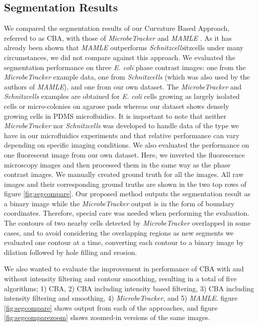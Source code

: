 \documentclass[journal]{IEEEtran}
\begin{document}
\subsection{Segmentation Results}
We compared the segmentation results of our Curvature Based Approach, referred to as CBA, with those of \textit{MicrobeTracker} \cite {sliusarenkohigh2011} and \textit{MAMLE} \cite {chowdhurycell2013}.  As it has already been shown that \textit{MAMLE} outperforms \textit{Schnitzcells}itzcells \cite { youngmeasuring2012} under many circumstances, we did not compare against this approach. We evaluated the segmentation performance on three \textit{E. coli} phase contrast images: one from the \textit{MicrobeTracker} example data, one from \textit{Schnitzcells} (which was also used by the authors of \textit{MAMLE}), and one from our own dataset. The \textit{MicrobeTracker} and  \textit{Schnitzcells} examples are obtained for \textit{E. coli} cells growing as largely isolated cells or micro-colonies on agarose pads whereas our dataset shows densely growing cells in PDMS microfluidics. It is important to note that neither \textit{MicrobeTracker} nor \textit{Schnitzcells} was developed to handle data of the type we have in our microfluidics experiments and that relative performance can vary depending on specific imaging conditions.  We also evaluated the performance on one fluorescent image from our own dataset. Here, we inverted the fluorescence microscopy images and then processed them in the same way as the phase contrast images. We manually created ground truth for all the images. All raw images and their corresponding ground truths are shown in the two top rows of figure \ref{fig:segcompare}. Our proposed method outputs the segmentation result as a binary image while the \textit{MicrobeTracker} output is in the form of boundary coordinates. Therefore, special care was needed when performing the evaluation. The contours of two nearby cells detected by \textit{MicrobeTracker} overlapped in some cases, and to avoid considering the overlapping regions as new segments we evaluated one contour at a time, converting each contour to a binary image by dilation followed by hole filling and erosion.

We also wanted to evaluate the improvement in performance of CBA with and without intensity filtering and contour smoothing, resulting in a total of five algorithms; 1) CBA, 2) CBA including intensity based filtering, 3) CBA including intensity filtering and smoothing, 4) \textit{MicrobeTracker}, and 5) \textit{MAMLE}. figure \ref{fig:segcompare} shows output from each of the approaches, and figure \ref{fig:segcomparezoom} shows zoomed-in versions of the same images.
\end{document}
